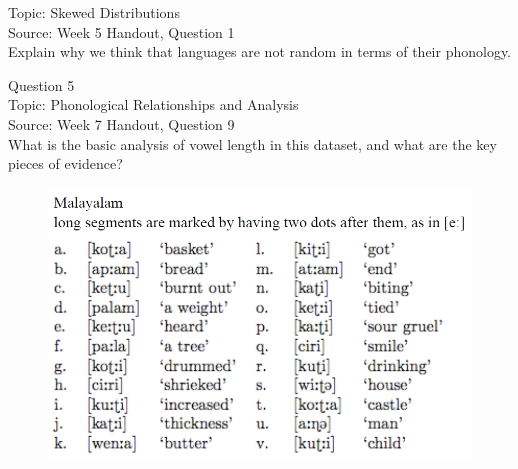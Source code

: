 \documentclass[12pt]{article}
\begin{document}
Topic: Skewed Distributions\\
Source: Week 5 Handout, Question 1\\

Explain why we think that languages are not random in terms of their phonology.\\


\newpage

{\large Question 5}\\

Topic: Phonological Relationships and Analysis\\
Source: Week 7 Handout, Question 9\\

What is the basic analysis of vowel length in this dataset, and what are the key pieces of evidence?\\

\begin{figure}[H]
\includegraphics{../images/malayalam.png}
\end{figure}

\newpage

\begin{center}
\textbf{{\color{red}{\HUGE END OF EXAM}}}\\

\end{center}
\newpage

\begin{center}
\textbf{{\color{blue}{\HUGE START OF EXAM\\}}}

\textbf{{\color{blue}{\HUGE Student ID: 34548\\}}}

\textbf{{\color{blue}{\HUGE \\}}}

\end{center}
\newpage
\end{document}
